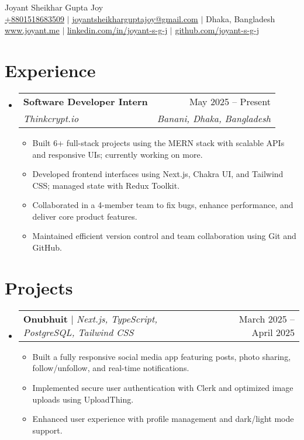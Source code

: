 \documentclass[a4paper,11pt]{article}
\makeatletter
\newcommand{\resumeItem}[1]{
  \item\small{
    {#1 \vspace{-2pt}}
  }
}
\newcommand{\resumeSubheading}[4]{
  \vspace{-2pt}\item
    \begin{tabular*}{0.97\textwidth}[t]{l@{\extracolsep{\fill}}r}
      \textbf{#1} & #2 \\
      \textit{\small#3} & \textit{\small #4} \\
    \end{tabular*}\vspace{-7pt}
}
\newcommand{\resumeProjectHeading}[2]{
    \item
    \begin{tabular*}{0.97\textwidth}{l@{\extracolsep{\fill}}r}
      \small#1 & #2 \\
    \end{tabular*}\vspace{-7pt}
}
\newcommand{\resumeSubHeadingListStart}{\begin{itemize}[leftmargin=0.15in, label={}]}
\newcommand{\resumeSubHeadingListEnd}{\end{itemize}}
\newcommand{\resumeItemListStart}{\begin{itemize}}
\newcommand{\resumeItemListEnd}{\end{itemize}\vspace{-5pt}}
\makeatother
\begin{document}
\begin{center}
    {\Huge \rmfamily Joyant Sheikhar Gupta Joy} \\ \vspace{1pt}
    \small \href{tel:+8801518683509}{\underline{+8801518683509}} $|$ 
    \href{mailto:joyantsheikharguptajoy@gmail.com}{\underline{joyantsheikharguptajoy@gmail.com}} $|$ 
    \small{Dhaka, Bangladesh} \\
    \href{https://joyant.me/}{\underline{www.joyant.me}} $|$
    \href{https://www.linkedin.com/in/joyant-s-g-j/}{\underline{linkedin.com/in/joyant-s-g-j}} $|$
    \href{https://github.com/joyant-s-g-j}{\underline{github.com/joyant-s-g-j}}
\end{center}

\section{\textbf{Experience}}
  \resumeSubHeadingListStart
    \resumeSubheading
      {Software Developer Intern}{May 2025 -- Present}
      {Thinkcrypt.io}{Banani, Dhaka, Bangladesh }
      \resumeItemListStart
        \resumeItem{Built 6+ full-stack projects using the MERN stack with scalable APIs and responsive UIs; currently working on more.}
        \resumeItem{Developed frontend interfaces using Next.js, Chakra UI, and Tailwind CSS; managed state with Redux Toolkit.}
        \resumeItem{Collaborated in a 4-member team to fix bugs, enhance performance, and deliver core product features.}
        \resumeItem{Maintained efficient version control and team collaboration using Git and GitHub.}
      \resumeItemListEnd
  \resumeSubHeadingListEnd

\section{Projects}
  \resumeSubHeadingListStart
    \resumeProjectHeading
        {\textbf{Onubhuit} $|$ \emph{Next.js, TypeScript, PostgreSQL, Tailwind CSS}}{March 2025 -- April 2025}
        \resumeItemListStart
          \resumeItem{Built a fully responsive social media app featuring posts, photo sharing, follow/unfollow, and real-time notifications.}
          \resumeItem{Implemented secure user authentication with Clerk and optimized image uploads using UploadThing.}
          \resumeItem{Enhanced user experience with profile management and dark/light mode support.}
        \resumeItemListEnd
  \resumeSubHeadingListEnd
\end{document}
